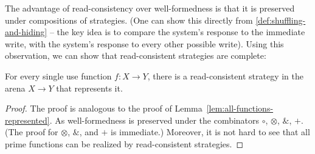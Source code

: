 The advantage of read-consistency over well-formedness is that it is preserved under compositions of strategies. 
(One can show this directly from \ref{def:shuffling-and-hiding} -- the key idea is to compare the system's response to the immediate write,
with the system's response to every other possible write). Using this observation, we can show that read-consistent strategies are complete:
\begin{lemma}\label{lem:all-read-consistent}
    For every single use function $f : X \to Y$, there is a read-consistent strategy in the arena $X \to Y$ that represents it. 
\end{lemma}
\begin{proof}
    The proof is analogous to the proof of Lemma~\ref{lem:all-functions-represented}. As well-formedness is preserved
    under the combinators $\circ$, $\otimes$, $\&$, $+$. (The proof for $\otimes$, $\&$, and $+$ is immediate.)
    Moreover, it is not hard to see that all prime functions can be realized by read-consistent strategies. 
\end{proof}

